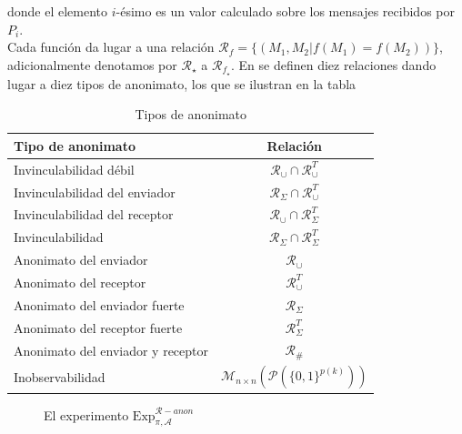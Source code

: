 donde el elemento $i$-ésimo es un valor calculado sobre los mensajes recibidos por $P_i$.\\
Cada función da lugar a una relación
$\mathcal{R}_f = \{(M_1, M_2 | f(M_1)=f(M_2))\}$, adicionalmente denotamos por
$\mathcal{R}_\star$ a $\mathcal{R}_{f_\star}$.
En \cite{conf/pet/HeviaM08} se definen diez relaciones dando lugar a diez tipos de anonimato, los
que se ilustran en la tabla 
\begin{table}
\begin{center}
\begin{tabular}{|l|c|}
\hline
Tipo de anonimato & Relación \\
\hline
\hline
Invinculabilidad débil & $\mathcal{R}_\cup \cap \mathcal{R}_\cup^T$ \\
\hline
Invinculabilidad del enviador & $\mathcal{R}_\Sigma \cap \mathcal{R}_\cup^T$ \\
\hline
Invinculabilidad del receptor & $\mathcal{R}_\cup \cap \mathcal{R}_\Sigma^T$ \\
\hline
Invinculabilidad & $\mathcal{R}_\Sigma \cap \mathcal{R}_\Sigma^T$ \\
\hline
Anonimato del enviador & $\mathcal{R}_\cup$ \\
\hline
Anonimato del receptor & $\mathcal{R}_\cup^T$ \\
\hline
Anonimato del enviador fuerte & $\mathcal{R}_\Sigma$ \\
\hline
Anonimato del receptor fuerte & $\mathcal{R}_\Sigma^T$ \\
\hline
Anonimato del enviador y receptor & $\mathcal{R}_\#$ \\
\hline
Inobservabilidad & $\mathcal{M}_{n \times n}(\mathcal{P}(\{0, 1\}^{p(k)}))$ \\
\hline
\end{tabular}
\end{center}
\caption{Tipos de anonimato}
\label{tabla_anon}
\end{table}

\begin{figure}
\begin{centering}
\end{centering}
\caption{El experimento $\mathrm{Exp}_{\pi, \mathcal{A}}^{\mathcal{R}-anon}$}
\label{exp_anon}
\end{figure}

